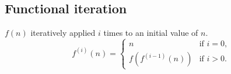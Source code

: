     \subsection{Functional iteration}
        \begin{definition}
            $f(n)$ iteratively applied $i$ times to an initial value of $n$.
            \begin{equation}
                f^{(i)}(n) = 
                \begin{cases}
                    n & \text{if } i = 0, \\
                    f\left(f^{(i-1)}(n)\right) & \text{if } i > 0.
                \end{cases}
            \end{equation}
        \end{definition}
        
